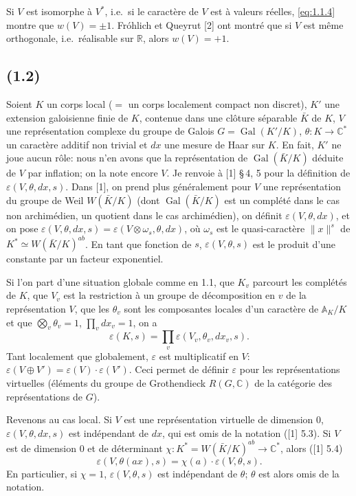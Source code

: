 \documentclass[11pt]{amsart}
\theoremstyle{plain}
\theoremstyle{definition}
\DeclareMathOperator{\Gal}{Gal}
\newcommand{\C}{\mathbb{C}}
\newcommand{\R}{\mathbb{R}}
\begin{document}
Si $V$ est isomorphe \`a $V^*$, i.e.~si le caract\`ere de $V$ est \`a valeurs r\'eelles, \eqref{eq:1.1.4} montre que $w(V)=\pm 1$. Fr\'ohlich et Queyrut [2] ont montr\'e que si $V$ est m\^eme orthogonale, i.e.~r\'ealisable sur $\R$, alors $w(V)=+1$.

\subsection{(1.2)}
Soient $K$ un corps local ($=$ un corps localement compact non discret), $K'$ une extension galoisienne finie de $K$, contenue dans une cl\^oture s\'eparable $\bar K$ de $K$, $V$ une repr\'esentation complexe du groupe de Galois $G=\Gal(K'/K)$, $\theta\colon K\to\C^*$ un caract\`ere additif non trivial et $dx$ une mesure de Haar sur $K$. En fait, $K'$ ne joue aucun r\^ole: nous n'en avons que la repr\'esentation de $\Gal(\bar K/K)$ d\'eduite de $V$ par inflation; on la note encore $V$. Je renvoie \`a [1] \S\,4, 5 pour la d\'efinition de $\varepsilon(V,\theta,dx,s)$. Dans [1], on prend plus g\'en\'eralement pour $V$ une repr\'esentation du groupe de Weil $W(\bar K/K)$ (dont $\Gal(\bar K/K)$ est un compl\'et\'e dans le cas non archim\'edien, un quotient dans le cas archim\'edien), on d\'efinit $\varepsilon(V,\theta,dx)$, et on pose $\varepsilon(V,\theta,dx,s)=\varepsilon(V\otimes\omega_s,\theta,dx)$, o\`u $\omega_s$ est le quasi-caract\`ere $\|x\|^s$ de $K^*\simeq W(\bar K/K)^{ab}$. En tant que fonction de $s$, $\varepsilon(V,\theta,s)$ est le produit d'une constante par un facteur exponentiel.

Si l'on part d'une situation globale comme en 1.1, que $K_v$ parcourt les compl\'et\'es de $K$, que $V_v$ est la restriction \`a un groupe de d\'ecomposition en $v$ de la repr\'esentation $V$, que les $\theta_v$ sont les composantes locales d'un caract\`ere de $\mathbb{A}_K/K$ et que $\bigotimes_v \theta_v=1$, $\prod_v dx_v=1$, on a
\begin{equation}\label{eq:1.2.1}
\varepsilon(K,s)=\prod_v \varepsilon(V_v,\theta_v,dx_v,s).
\end{equation}
Tant localement que globalement, $\varepsilon$ est multiplicatif en $V$: $\varepsilon(V\oplus V')=\varepsilon(V)\cdot\varepsilon(V')$. Ceci permet de d\'efinir $\varepsilon$ pour les repr\'esentations virtuelles (\'el\'ements du groupe de Grothendieck $R(G,\C)$ de la cat\'egorie des repr\'esentations de $G$).

Revenons au cas local. Si $V$ est une repr\'esentation virtuelle de dimension $0$, $\varepsilon(V,\theta,dx,s)$ est ind\'ependant de $dx$, qui est omis de la notation ([1] 5.3). Si $V$ est de dimension $0$ et de d\'eterminant $\chi\colon K^*=W(\bar K/K)^{ab}\to\C^*$, alors ([1] 5.4)
\begin{equation}\label{eq:1.2.2}
\varepsilon(V,\theta(ax),s)=\chi(a)\cdot\varepsilon(V,\theta,s).
\end{equation}
En particulier, si $\chi=1$, $\varepsilon(V,\theta,s)$ est ind\'ependant de $\theta$; $\theta$ est alors omis de la notation.
\end{document}

